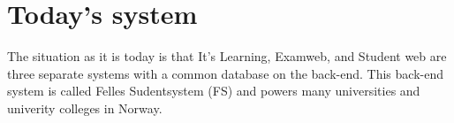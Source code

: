 \section{Today's system}

The situation as it is today is that It's Learning, Examweb, and Student web are three separate systems with a common database on the back-end. 
This back-end system is called Felles Sudentsystem (FS) and powers many universities and univerity colleges in Norway.

%
%
